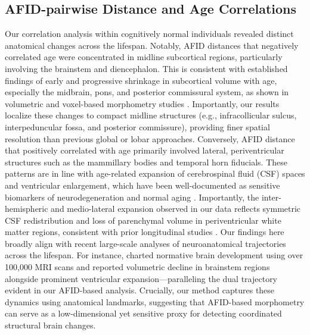 \subsection{AFID-pairwise Distance and Age Correlations}
Our correlation analysis within cognitively normal individuals revealed distinct anatomical changes across the lifespan. Notably, AFID distances that negatively correlated age were concentrated in midline subcortical regions, particularly involving the brainstem and diencephalon. This is consistent with established findings of early and progressive shrinkage in subcortical volume with age, especially the midbrain, pons, and posterior commissural system, as shown in volumetric and voxel-based morphometry studies \cite{Dima2022-dp, Raz2005-jr}. Importantly, our results localize these changes to compact midline structures (e.g., infracollicular sulcus, interpeduncular fossa, and posterior commissure), providing finer spatial resolution than previous global or lobar approaches. Conversely, AFID distance that positively correlated with age primarily involved lateral, periventricular structures such as the mammillary bodies and temporal horn fiducials. These patterns are in line with age-related expansion of cerebrospinal fluid (CSF) spaces and ventricular enlargement, which have been well-documented as sensitive biomarkers of neurodegeneration and normal aging \cite{Fujita2023-vi,Resnick2003-je,Bethlehem2022-ow}. Importantly, the inter-hemispheric and medio-lateral expansion observed in our data reflects symmetric CSF redistribution and loss of parenchymal volume in periventricular white matter regions, consistent with prior longitudinal studies \cite{Fujita2023-vi,De-Vis2016-li}. Our findings here broadly align with recent large-scale analyses of neuroanatomical trajectories across the lifespan. For instance, \cite{Bethlehem2022-ow} charted normative brain development using over 100,000 MRI scans and reported volumetric decline in brainstem regions alongside prominent ventricular expansion—paralleling the dual trajectory evident in our AFID-based analysis. Crucially, our method captures these dynamics using anatomical landmarks, suggesting that AFID-based morphometry can serve as a low-dimensional yet sensitive proxy for detecting coordinated structural brain changes.

